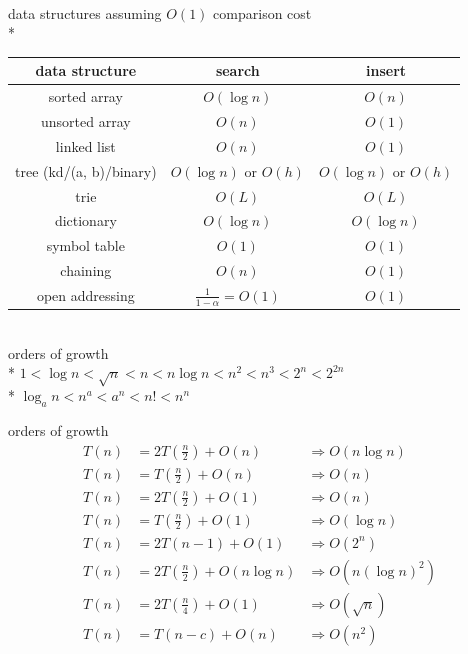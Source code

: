 \documentclass[10pt, landscape]{article}
\newenvironment{tightcenter}{%
  \setlength\topsep{0pt}
  \setlength\parskip{0pt}
  \begin{center}
}{%
  \end{center}
}
\begin{document}
\begin{multicols}{3}
\begin{tightcenter}
        \\ data structures assuming $O(1)$ comparison cost
        \\* \begin{tabular}{| c | c | c |}\hline
            \textbf{data structure} & \textbf{search} & \textbf{insert}\\\hline
            sorted array & $O(\log n)$ & $O(n)$ \\\hline
            unsorted array & $O(n)$ & $O(1)$ \\\hline
            linked list & $O(n)$ & $O(1)$ \\\hline
            tree (kd/(a, b)/binary) & $O(\log n)$ or $O(h)$ & $O(\log n)$ or $O(h)$ \\\hline
            trie & $O(L)$ & $O(L)$ \\\hline
            dictionary & $O(\log n)$ & $O(\log n)$ \\\hline
            symbol table & $O(1)$ & $O(1)$ \\\hline
            chaining & $O(n)$ & $O(1)$ \\\hline
            open addressing & $\frac{1}{1-\alpha} = O(1)$ & $O(1)$ \\\hline
        \end{tabular}

        \ 
        \\ orders of growth
        \\* $1 < \log n < \sqrt{n} < n < n \log n < n^2 < n^3 < 2^n < 2^{2n}$
        \\* $\log_a n < n^a < a^n < n! < n^n$

        orders of growth
        \begin{align*}
            T(n) &= 2T(\frac{n}{2}) + O(n) &\Rightarrow O(n \log n)
            \\ T(n) &= T(\frac{n}{2}) + O(n) &\Rightarrow O(n)
            \\ T(n) &= 2T(\frac{n}{2}) + O(1) &\Rightarrow O(n)
            \\ T(n) &= T(\frac{n}{2}) + O(1) &\Rightarrow O(\log n)
            \\ T(n) &= 2T(n - 1) + O(1) &\Rightarrow O(2^n)
            \\ T(n) &= 2T(\frac{n}{2}) + O(n \log n) &\Rightarrow O(n(\log n)^2)
            \\ T(n) &= 2T(\frac{n}{4}) + O(1) &\Rightarrow O(\sqrt{n})
            \\ T(n) &= T(n - c) + O(n) &\Rightarrow O(n^2)
        \end{align*}
    \end{tightcenter}
\end{multicols}
\end{document}
